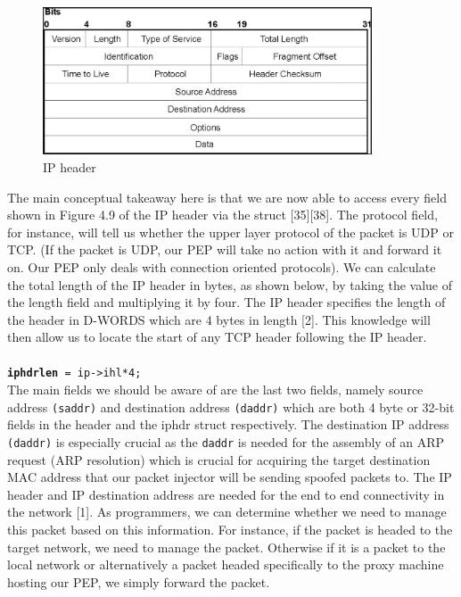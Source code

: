 \documentclass{uathesis}
\begin{document}
\begin{figure}[h!]
    \centering
    \includegraphics[width=0.87\textwidth]{ipHDR.png}
    \caption{IP header}
    \label{fig: IP Header} 
\end{figure}

The main conceptual takeaway here is that we are now able to access every field shown in Figure 4.9 of the IP header via the struct [35][38]. The protocol field, for instance, will tell us whether the upper layer protocol of the packet is UDP or TCP. (If the packet is UDP, our PEP will take no action with it and forward it on. Our PEP only deals with connection oriented protocols). We can calculate the total length of the IP header in bytes, as shown below, by taking the value of the length field and multiplying it by four. The IP header specifies the length of the header in D-WORDS which are 4 bytes in length [2]. This knowledge will then allow us to locate the start of any TCP header following the IP header.\\

 \\
{\tt \textbf{iphdrlen} = ip->ihl*4;} \\

The main fields we should be aware of are the last two fields, namely source address {\tt (saddr)} and destination address {\tt (daddr)} which are both 4 byte or 32-bit fields in the header and the iphdr struct respectively. The destination IP address {\tt (daddr)} is especially crucial as the {\tt daddr} is needed for the assembly of an ARP request (ARP resolution) which is crucial for acquiring the target destination MAC address that our packet injector will be sending spoofed packets to. The IP header and IP destination address are needed for the end to end connectivity in the network [1]. As programmers, we can determine whether we need to manage this packet based on this information. For instance, if the packet is headed to the target network, we need to manage the packet. Otherwise if it is a packet to the local network or alternatively a packet headed specifically to the proxy machine hosting our PEP, we simply forward the packet.  \\
\end{document}
